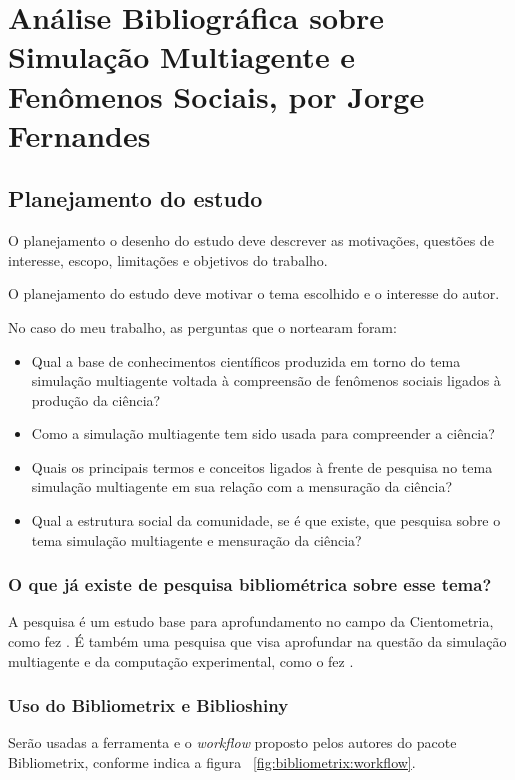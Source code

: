 \chapter{Análise Bibliográfica sobre Simulação Multiagente e Fenômenos Sociais, por Jorge Fernandes}

\section{Planejamento do estudo}
O planejamento o  desenho do estudo deve descrever as motivações, questões de interesse, escopo, limitações e objetivos do trabalho.

O planejamento do estudo deve motivar o tema escolhido e o interesse do autor.

No caso do meu trabalho, as perguntas que o nortearam foram:
\begin{itemize}
    \item Qual a base de conhecimentos científicos produzida em torno do tema simulação multiagente voltada à compreensão de fenômenos sociais ligados à produção da ciência? 
    \item Como a simulação multiagente tem sido usada para compreender a ciência? 
    \item Quais os principais termos e conceitos ligados à frente de pesquisa no tema simulação multiagente em sua relação com a  mensuração da ciência? 
    \item Qual a estrutura social da comunidade, se é que existe, que pesquisa sobre o tema simulação multiagente e mensuração da ciência?
\end{itemize}

\subsection{O que já existe de pesquisa bibliométrica sobre esse tema?}

A pesquisa é um estudo base para aprofundamento no campo da Cientometria, como fez \cite{chavalarias_whats_2017}.
É também uma pesquisa que visa aprofundar na questão da simulação multiagente e da computação experimental, como o fez \cite{gore_classifying_2016}.


\subsection{Uso do Bibliometrix e Biblioshiny}
Serão usadas a ferramenta e o \textit{workflow} proposto pelos autores do pacote Bibliometrix, conforme indica a figura ~\ref{fig:bibliometrix:workflow}.

